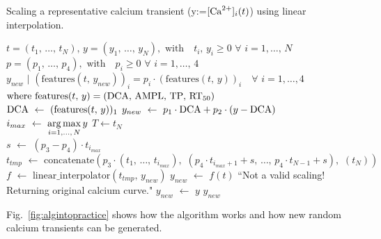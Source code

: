 \begin{algorithm}
    \caption{Scaling a representative calcium transient (y:=$[\textrm{Ca}^{2+}]_{i}(t)$) using linear interpolation.}\label{alg:cascaling}
    \begin{algorithmic} 
    \REQUIRE $t=(t_1,\,\dots,\,t_N),\,y=(y_1,\,\dots,\,y_N),\,\,\textrm{with}\quad t_i,\,y_i\ge 0\,\,\forall\,\,i=1,\dots,\,N$ \\ $p=(p_1,\,\dots,\,p_4),\,\,\textrm{with}\quad p_i\ge 0\,\,\forall\,\,i=1,\dots,\,4$
    \ENSURE $y_{new}\,\,|\,\,(\textrm{features}(t,\,y_{new}))_{i} = p_i\cdot(\textrm{features}(t,\,y))_{i}\quad\forall\,\,i=1,\dots,4$ \\ $\textrm{where}\,\,\textrm{features}(t,\,y) = (\textrm{DCA},\,\textrm{AMPL},\,\textrm{TP},\,\textrm{RT}_{50})$ \\ \vspace{0.2cm}
    \STATE $\textrm{DCA}\,\,\leftarrow\,\,(\textrm{features}(t,\,y))_1$
    \STATE $y_{new}\,\,\leftarrow\,\,p_1\cdot\textrm{DCA} + p_2\cdot(y-\textrm{DCA})$
    \STATE $i_{max}\,\,\leftarrow\,\,\operatorname*{arg\,max}\limits_{i=1,\dots,\,N}{y}$
    \STATE $T \leftarrow t_{N}$ \\
    \vspace{0.2cm}
    \STATE $s\,\,\leftarrow\,\,(p_3 - p_4)\cdot t_{i_{max}}$
    \STATE $t_{tmp}\,\,\leftarrow\,\,\textrm{concatenate}(p_3\cdot (t_{1},\,\dots,\,t_{i_{max}}),\,\,(p_4\cdot t_{i_{max}+1}+s,\,\dots,\,p_4\cdot t_{N-1}+s),\,\,(t_{N}))$
    \STATE $f\,\,\leftarrow\,\,\textrm{linear\_interpolator}(t_{tmp},\, y_{new})$
    \STATE $y_{new}\,\,\leftarrow\,\,f(t)$
    \ELSE
    \PRINT ``Not a valid scaling! Returning original calcium curve."
    \STATE $y_{new}\,\,\leftarrow\,\,y$
    \ENDIF
    \RETURN $y_{new}$
    \end{algorithmic}
\end{algorithm}

\vspace{0.2cm}
Fig.~\ref{fig:algintopractice} shows how the algorithm works and how new random calcium transients can be generated.

